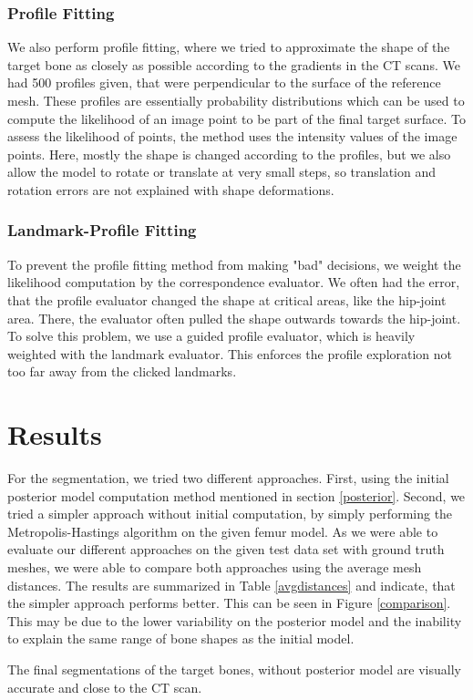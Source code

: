\documentclass{IEEEtran}
\begin{document}
\subsubsection{Profile Fitting}
We also perform profile fitting, where we tried to approximate the shape of the target bone as closely as possible according to the gradients in the CT scans. We had 500 profiles given, that were perpendicular to the surface of the reference mesh. These profiles are essentially probability distributions which can be used to compute the likelihood of an image point to be part of the final target surface. To assess the likelihood of points, the method uses the intensity values of the image points. Here, mostly the shape is changed according to the profiles, but we also allow the model to rotate or translate at very small steps, so translation and rotation errors are not explained with shape deformations.

\subsubsection{Landmark-Profile Fitting}
To prevent the profile fitting method from making "bad" decisions, we weight the likelihood computation by the correspondence evaluator. We often had the error, that the profile evaluator changed the shape at critical areas, like the hip-joint area. There, the evaluator often pulled the shape outwards towards the hip-joint. To solve this problem, we use a guided profile evaluator, which is heavily weighted with the landmark evaluator. This enforces the profile exploration not too far away from the clicked landmarks.

\section{Results}
For the segmentation, we tried two different approaches. First, using the initial posterior model computation method mentioned in section \ref{posterior}. Second, we tried a simpler approach without initial computation, by simply performing the Metropolis-Hastings algorithm on the given femur model. As we were able to evaluate our different approaches on the given test data set with ground truth meshes, we were able to compare both approaches using the average mesh distances. The results are summarized in Table \ref{avgdistances} and indicate, that the simpler approach performs better. This can be seen in Figure \ref{comparison}. This may be due to the lower variability on the posterior model and the inability to explain the same range of bone shapes as the initial model.\par
The final segmentations of the target bones, without posterior model are visually accurate and close to the CT scan.
\end{document}
